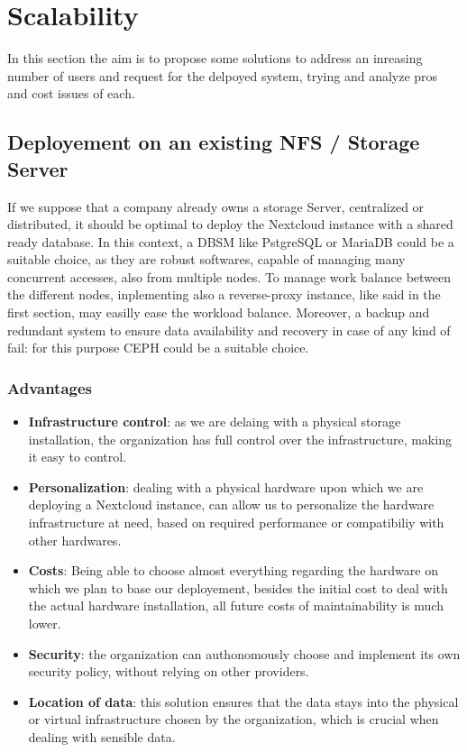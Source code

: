 \documentclass{article}
\begin{document}
	\section{Scalability}
	In this section the aim is to propose some solutions to address an inreasing number of users and request for the delpoyed system, trying and analyze pros and cost issues of each.
	
	\subsection{Deployement on an existing NFS / Storage Server}
	If we suppose that a company already owns a storage Server, centralized or distributed, it should be optimal to deploy the Nextcloud instance with a shared ready database. In this context, a DBSM like PstgreSQL or MariaDB could be a suitable choice, as they are robust softwares, capable of managing many concurrent accesses, also from multiple nodes. To manage work balance between the different nodes, inplementing also a reverse-proxy instance, like said in the first section, may easilly ease the workload balance. Moreover, a backup and redundant system to ensure data availability and recovery in case of any kind of fail: for this purpose CEPH could be a suitable choice.
	
	\subsubsection{Advantages}
	\begin{itemize}
		\item \textbf{Infrastructure control}:  as we are delaing with a physical storage installation, the organization has full control over the infrastructure, making it easy to control.
		\item \textbf{Personalization}: dealing with a physical hardware upon which we are deploying a Nextcloud instance, can allow us to personalize the hardware infrastructure at need, based on required performance or compatibiliy with other hardwares.
		\item \textbf{Costs}: Being able to choose almost everything regarding the hardware on which we plan to base our deployement, besides the initial cost to deal with the actual hardware installation, all future costs of maintainability is much lower.
		\item \textbf{Security}: the organization can authonomously choose and implement its own security policy, without relying on other providers.
		\item \textbf{Location of data}: this solution ensures that the data stays into the physical or virtual infrastructure chosen by the organization, which is crucial when dealing with sensible data.
	\end{itemize}
	
\end{document}
